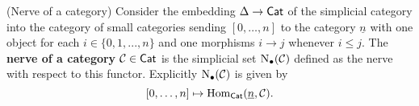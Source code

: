 \documentclass[thesis.tex]{subfiles}
\begin{document}
\begin{example}(Nerve of a category)\label{nerve of a category}
Consider the embedding $\Delta\to\mathsf{Cat}$ of the simplicial category into the category of small categories sending $[0,\dotsc,n]$ to the category $\underline n$ with one object for each $i\in\{0,1,...,n\}$ and one morphisms $i\to j$ whenever $i\leq j$. The \textbf{nerve of a category} $\operatorname{\mathcal{C}}\in\mathsf{Cat}$ is the simplicial set $\mathrm N_\bullet(\operatorname{\mathcal{C}})$ defined as the nerve with respect to this functor. Explicitly $\mathrm N_\bullet(\operatorname{\mathcal{C}})$ is given by $$[0,\dotsc,n]\mapsto\mathrm{Hom}_{\mathsf{Cat}}(\underline n,\operatorname{\mathcal{C}}).$$
\end{example}
\end{document}
